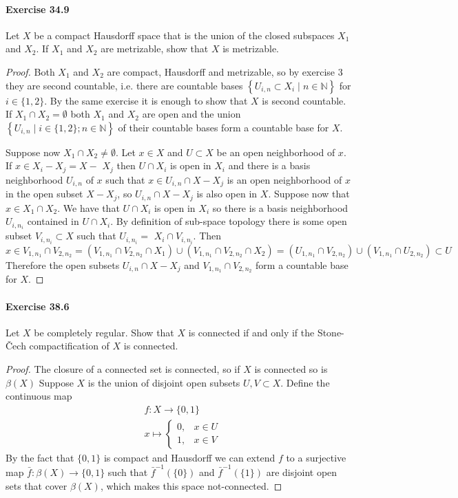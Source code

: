 \documentclass{article}
\begin{document}
\paragraph{Exercise 34.9} Let $X$ be a compact Hausdorff space that is the union of the closed subspaces $X_1$ and $X_2$. If $X_1$ and $X_2$ are metrizable, show that $X$ is metrizable.
\begin{proof}
    Both $X_1$ and $X_2$ are compact, Hausdorff and metrizable, so by exercise 3 they are second countable, i.e. there are countable bases $\left\{U_{i, n} \subset X_i \mid n \in \mathbb{N}\right\}$ for $i \in\{1,2\}$. By the same exercise it is enough to show that $X$ is second countable. If $X_1 \cap X_2=\emptyset$ both $X_1$ and $X_2$ are open and the union $\left\{U_{i, n} \mid i \in\{1,2\} ; n \in \mathbb{N}\right\}$ of their countable bases form a countable base for $X$.

Suppose now $X_1 \cap X_2 \neq \emptyset$. Let $x \in X$ and $U \subset X$ be an open neighborhood of $x$. If $x \in X_i-X_j=X-$ $X_j$ then $U \cap X_i$ is open in $X_i$ and there is a basis neighborhood $U_{i, n}$ of $x$ such that $x \in U_{i, n} \cap X-X_j$ is an open neighborhood of $x$ in the open subset $X-X_j$, so $U_{i, n} \cap X-X_j$ is also open in $X$.
Suppose now that $x \in X_1 \cap X_2$. We have that $U \cap X_i$ is open in $X_i$ so there is a basis neighborhood $U_{i, n_i}$ contained in $U \cap X_i$. By definition of sub-space topology there is some open subset $V_{i, n_i} \subset X$ such that $U_{i, n_i}=$ $X_i \cap V_{i, n_i}$. Then
$$
x \in V_{1, n_1} \cap V_{2, n_2}=\left(V_{1, n_1} \cap V_{2, n_2} \cap X_1\right) \cup\left(V_{1, n_1} \cap V_{2, n_2} \cap X_2\right)=\left(U_{1, n_1} \cap V_{2, n_2}\right) \cup\left(V_{1, n_1} \cap U_{2, n_2}\right) \subset U
$$
Therefore the open subsets $U_{i, n} \cap X-X_j$ and $V_{1, n_1} \cap V_{2, n_2}$ form a countable base for $X$.
\end{proof}



\paragraph{Exercise 38.6} Let $X$ be completely regular. Show that $X$ is connected if and only if the Stone-Čech compactification of $X$ is connected.
\begin{proof}
    The closure of a connected set is connected, so if $X$ is connected so is $\beta(X)$
Suppose $X$ is the union of disjoint open subsets $U, V \subset X$. Define the continuous map
$$
\begin{aligned}
& f: X \rightarrow\{0,1\} \\
& x \mapsto \begin{cases}0, & x \in U \\
1, & x \in V\end{cases}
\end{aligned}
$$
By the fact that $\{0,1\}$ is compact and Hausdorff we can extend $f$ to a surjective map $\bar{f}: \beta(X) \rightarrow\{0,1\}$ such that $\bar{f}^{-1}(\{0\})$ and $\bar{f}^{-1}(\{1\})$ are disjoint open sets that cover $\beta(X)$, which makes this space not-connected.
\end{proof}
\end{document}

